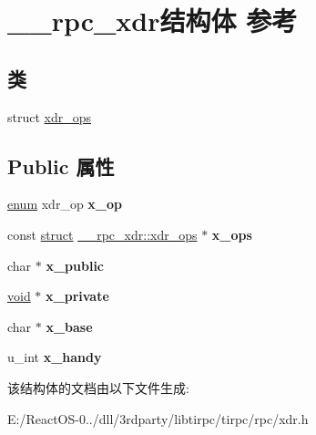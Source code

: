 \hypertarget{struct____rpc__xdr}{}\section{\+\_\+\+\_\+rpc\+\_\+xdr结构体 参考}
\label{struct____rpc__xdr}
\subsection*{类}
\begin{DoxyCompactItemize}
\item 
struct \hyperlink{struct____rpc__xdr_1_1xdr__ops}{xdr\+\_\+ops}
\end{DoxyCompactItemize}
\subsection*{Public 属性}
\begin{DoxyCompactItemize}
\item 
\mbox{\label{struct____rpc__xdr_a62cea22a3d54300598742ff636345099}} 
\hyperlink{interfaceenum}{enum} xdr\+\_\+op {\bfseries x\+\_\+op}
\item 
\mbox{\label{struct____rpc__xdr_a5f5255653e0c17aebc9e37d9b43247db}} 
const \hyperlink{interfacestruct}{struct} \hyperlink{struct____rpc__xdr_1_1xdr__ops}{\+\_\+\+\_\+rpc\+\_\+xdr\+::xdr\+\_\+ops} $\ast$ {\bfseries x\+\_\+ops}
\item 
\mbox{\label{struct____rpc__xdr_acceb88b68f583b21f4f5a420e5673da1}} 
char $\ast$ {\bfseries x\+\_\+public}
\item 
\mbox{\label{struct____rpc__xdr_aa274702f95af834b46c68f16ac84a65e}} 
\hyperlink{interfacevoid}{void} $\ast$ {\bfseries x\+\_\+private}
\item 
\mbox{\label{struct____rpc__xdr_a989a34c79706434d6c239e519d984e19}} 
char $\ast$ {\bfseries x\+\_\+base}
\item 
\mbox{\label{struct____rpc__xdr_af13c3922d6aabce1cddbf81f842cd485}} 
u\+\_\+int {\bfseries x\+\_\+handy}
\end{DoxyCompactItemize}


该结构体的文档由以下文件生成\+:\begin{DoxyCompactItemize}
\item 
E\+:/\+React\+O\+S-\/0../dll/3rdparty/libtirpc/tirpc/rpc/xdr.\+h\end{DoxyCompactItemize}
